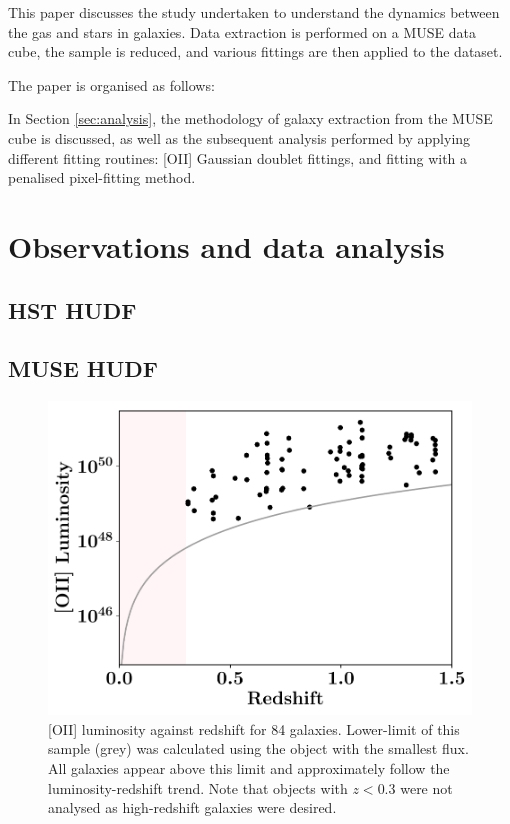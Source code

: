 \documentclass[12pt, twocolumn]{revtex4-1}    %
\begin{document}

This paper discusses the study undertaken to understand the dynamics between the gas and stars in galaxies. Data extraction is performed on a MUSE data cube, the sample is reduced, and various fittings are then applied to the dataset.

The paper is organised as follows:

In Section \ref{sec:analysis}, the methodology of galaxy extraction from the MUSE cube is discussed, as well as the subsequent analysis performed by applying different fitting routines: [OII] Gaussian doublet fittings, and fitting with a penalised pixel-fitting method. 

\vspace{2ex} %
\section{Observations and data analysis}
\subsection{HST HUDF}
\noindent

\vspace{2ex} %
\subsection{MUSE HUDF}
\noindent

\begin{figure}
\includegraphics[width=1.0\linewidth]{data/o_ii_luminosity_vs_redshift}
\caption{[OII] luminosity against redshift for 84 galaxies. Lower-limit of this sample (grey) was calculated using the object with the smallest flux. All galaxies appear above this limit and approximately follow the luminosity-redshift trend. Note that objects with $z<0.3$ were not analysed as high-redshift galaxies were desired. }
\label{fig:oiiluminosity_redshift}
\end{figure} 
\end{document}
